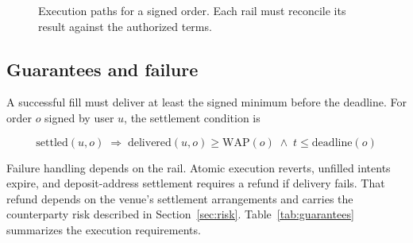\begin{figure}[ht]
\centering
{}
\caption{Execution paths for a signed order. Each rail must reconcile its result against the authorized terms.}
\label{fig:rails}
\end{figure}

\subsection{Guarantees and failure}

A successful fill must deliver at least the signed minimum before the deadline. For order $o$ signed by user $u$, the settlement condition is

\begin{equation}
\mathrm{settled}(u, o) \;\Longrightarrow\; \mathrm{delivered}(u, o) \geq \mathrm{WAP}(o) \;\land\; t \leq \mathrm{deadline}(o)
\end{equation}

\noindent Failure handling depends on the rail. Atomic execution reverts, unfilled intents expire, and deposit-address settlement requires a refund if delivery fails. That refund depends on the venue's settlement arrangements and carries the counterparty risk described in Section~\ref{sec:risk}. Table~\ref{tab:guarantees} summarizes the execution requirements.

